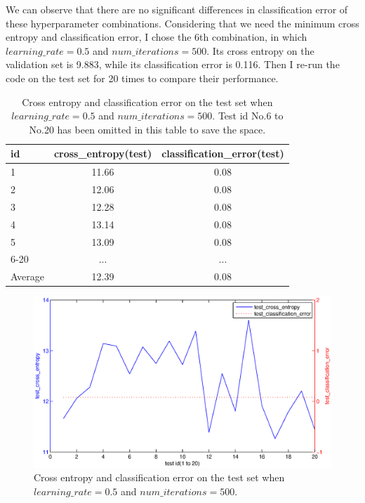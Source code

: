 \documentclass{article}
\begin{document}
We can observe that there are no significant differences in classification error of these hyperparameter combinations. Considering that we need the minimum cross entropy and classification error, I chose the 6th combination, in which $learning\_rate=0.5$ and $num\_iterations=500$. Its cross entropy on the validation set is 9.883, while its classification error is 0.116. Then I re-run the code on the test set for 20 times to compare their performance.\\

\begin{table}[htbp]
\centering
\begin{tabular}{lcc}
\toprule
id & cross\_entropy(test) & classification\_error(test) \\
\midrule
1   & 11.66 & 0.08\\
2   & 12.06 & 0.08\\
3   & 12.28 & 0.08\\
4   & 13.14 & 0.08\\
5   & 13.09 & 0.08\\
6-20& ...   & ... \\
\midrule
Average & 12.39 & 0.08\\
\bottomrule
\end{tabular}
\caption{Cross entropy and classification error on the test set when $learning\_rate=0.5$ and $num\_iterations=500$. Test id No.6 to No.20 has been omitted in this table to save the space. 
\label{table:hyper-final}}
\end{table} 

\begin{figure}[htb]
\centering
\includegraphics[width=\textwidth]{logistic-test-m.eps}
\caption{Cross entropy and classification error on the test set when $learning\_rate=0.5$ and $num\_iterations=500$.
\label{fig:logistic-test}}
\end{figure}
\end{document}
